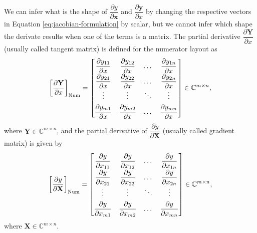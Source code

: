 \documentclass{article}
\begin{document}
We can infer what is the shape of \(\dfrac{\partial y}{\partial \mathbf{x}}\) and \(\dfrac{\partial \mathbf{y}}{\partial x}\) by changing the respective vectors in Equation \eqref{eq:jacobian-formulation} by scalar, but we cannot infer which shape the derivate results when one of the terms is a matrix. The partial derivative \(\dfrac{\partial \mathbf{Y}}{\partial x}\) (usually called tangent matrix) is defined for the numerator layout as
\begin{align}
    \left[\dfrac{\partial \mathbf{Y}}{\partial x}\right]_{\textnormal{Num}} \renewcommand{\arraystretch}{1.8} = \begin{bmatrix}
        \dfrac{\partial y_{11}}{\partial x} & \dfrac{\partial y_{12}}{\partial x} & \dots & \dfrac{\partial y_{1n}}{\partial x} \\
        \dfrac{\partial y_{21}}{\partial x} & \dfrac{\partial y_{22}}{\partial x} & \dots & \dfrac{\partial y_{2n}}{\partial x} \\
        \vdots & \vdots & \ddots & \vdots \\
        \dfrac{\partial y_{m1}}{\partial x} & \dfrac{\partial y_{m2}}{\partial x} & \dots & \dfrac{\partial y_{mn}}{\partial x} \\
    \end{bmatrix} \in \mathbb{C}^{m \times n},
\end{align}
where \(\mathbf{Y} \in \mathbb{C}^{m \times n}\), and the partial derivative of \(\dfrac{\partial y}{\partial \mathbf{X}}\) (usually called gradient matrix) is given by
\begin{align}
    \renewcommand{\arraystretch}{1.8}
			\left[\dfrac{\partial y}{\partial \mathbf{X}}\right]_{\textnormal{Num}} = \begin{bmatrix}
				\dfrac{\partial y}{\partial x_{11}} & \dfrac{\partial y}{\partial x_{12}} & \dots & \dfrac{\partial y}{\partial x_{1n}} \\
				\dfrac{\partial y}{\partial x_{21}} & \dfrac{\partial y}{\partial x_{22}} & \dots & \dfrac{\partial y}{\partial x_{2n}} \\
				\vdots & \vdots & \ddots & \vdots \\
				\dfrac{\partial y}{\partial x_{m1}} & \dfrac{\partial y}{\partial x_{m2}} & \dots & \dfrac{\partial y}{\partial x_{mn}} \\
			\end{bmatrix} \in \mathbb{C}^{m \times n},
\end{align}
where \(\mathbf{X} \in \mathbb{C}^{m \times n}\).
\end{document}
